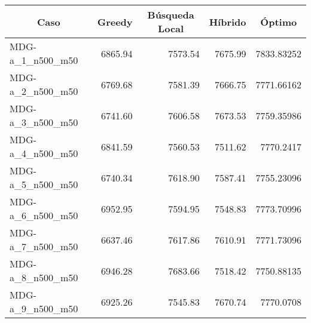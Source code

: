 \documentclass[10pt,a4paper]{article}
\begin{document}
\begin{table}[h]
	\centering
	\begin{tabular}{|l|r|r|r|r|}
		\hline
		\multicolumn{1}{|c|}{\textbf{Caso}} & \multicolumn{1}{c|}{\textbf{Greedy}} & \multicolumn{1}{c|}{\textbf{Búsqueda Local}} & \multicolumn{1}{c|}{\textbf{Híbrido}} & \multicolumn{1}{c|}{\textbf{Óptimo}} \\ \hline
		MDG-a\_1\_n500\_m50                 & 6865.94                              & 7573.54                                      & 7675.99                               & 7833.83252                           \\ \hline
		MDG-a\_2\_n500\_m50                 & 6769.68                              & 7581.39                                      & 7666.75                               & 7771.66162                           \\ \hline
		MDG-a\_3\_n500\_m50                 & 6741.60                              & 7606.58                                      & 7673.53                               & 7759.35986                           \\ \hline
		MDG-a\_4\_n500\_m50                 & 6841.59                              & 7560.53                                      & 7511.62                               & 7770.2417                            \\ \hline
		MDG-a\_5\_n500\_m50                 & 6740.34                              & 7618.90                                      & 7587.41                               & 7755.23096                           \\ \hline
		MDG-a\_6\_n500\_m50                 & 6952.95                              & 7594.95                                      & 7548.83                               & 7773.70996                           \\ \hline
		MDG-a\_7\_n500\_m50                 & 6637.46                              & 7617.86                                      & 7610.91                               & 7771.73096                           \\ \hline
		MDG-a\_8\_n500\_m50                 & 6946.28                              & 7683.66                                      & 7518.42                               & 7750.88135                           \\ \hline
		MDG-a\_9\_n500\_m50                 & 6925.26                              & 7545.83                                      & 7670.74                               & 7770.0708                            \\ \hline

\end{tabular}
\end{table}
\end{document}
